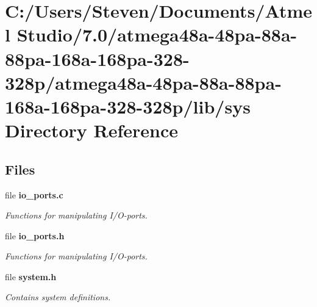 \section{C\+:/\+Users/\+Steven/\+Documents/\+Atmel Studio/7.0/atmega48a-\/48pa-\/88a-\/88pa-\/168a-\/168pa-\/328-\/328p/atmega48a-\/48pa-\/88a-\/88pa-\/168a-\/168pa-\/328-\/328p/lib/sys Directory Reference}
\label{dir_1dacc5f4fcb865f1d9e042339dad3519}
\subsection*{Files}
\begin{DoxyCompactItemize}
\item 
file {\bf io\+\_\+ports.\+c}
\begin{DoxyCompactList}\small\item\em Functions for manipulating I/\+O-\/ports. \end{DoxyCompactList}\item 
file {\bf io\+\_\+ports.\+h}
\begin{DoxyCompactList}\small\item\em Functions for manipulating I/\+O-\/ports. \end{DoxyCompactList}\item 
file {\bf system.\+h}
\begin{DoxyCompactList}\small\item\em Contains system definitions. \end{DoxyCompactList}\end{DoxyCompactItemize}
